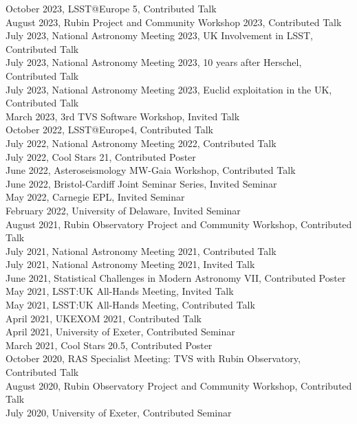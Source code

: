 \documentclass[letter, margin, 10pt]{res} %
\begin{document}
\begin{resume}
\vspace{-4pt}
October 2023, LSST@Europe 5, Contributed Talk\\
August 2023, Rubin Project and Community Workshop 2023, Contributed Talk\\
July 2023, National Astronomy Meeting 2023, UK Involvement in LSST, Contributed Talk\\
July 2023, National Astronomy Meeting 2023, 10 years after Herschel, Contributed Talk\\
July 2023, National Astronomy Meeting 2023, Euclid exploitation in the UK, Contributed Talk\\
March 2023, 3rd TVS Software Workshop, Invited Talk\\
October 2022, LSST@Europe4, Contributed Talk\\
July 2022, National Astronomy Meeting 2022, Contributed Talk\\
July 2022, Cool Stars 21, Contributed Poster\\
June 2022, Asteroseismology MW-Gaia Workshop, Contributed Talk\\
June 2022, Bristol-Cardiff Joint Seminar Series, Invited Seminar\\
May 2022, Carnegie EPL, Invited Seminar\\
February 2022, University of Delaware, Invited Seminar\\
August 2021, Rubin Observatory Project and Community Workshop, Contributed Talk\\
July 2021, National Astronomy Meeting 2021, Contributed Talk\\
July 2021, National Astronomy Meeting 2021, Invited Talk\\
June 2021, Statistical Challenges in Modern Astronomy VII, Contributed Poster\\
May 2021, LSST:UK All-Hands Meeting, Invited Talk\\
May 2021, LSST:UK All-Hands Meeting, Contributed Talk\\
April 2021, UKEXOM 2021, Contributed Talk\\
April 2021, University of Exeter, Contributed Seminar\\
March 2021, Cool Stars 20.5, Contributed Poster\\
October 2020, RAS Specialist Meeting: TVS with Rubin Observatory, Contributed Talk\\
August 2020, Rubin Observatory Project and Community Workshop, Contributed Talk\\
July 2020, University of Exeter, Contributed Seminar\\

\end{resume}
\end{document}
